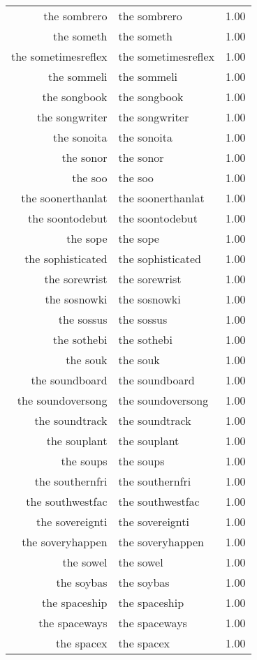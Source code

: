 \begin{table}[ht]
\begin{tabular}{rlr}
  the sombrero & the sombrero & 1.00 \\ 
  the someth & the someth & 1.00 \\ 
  the sometimesreflex & the sometimesreflex & 1.00 \\ 
  the sommeli & the sommeli & 1.00 \\ 
  the songbook & the songbook & 1.00 \\ 
  the songwriter & the songwriter & 1.00 \\ 
  the sonoita & the sonoita & 1.00 \\ 
  the sonor & the sonor & 1.00 \\ 
  the soo & the soo & 1.00 \\ 
  the soonerthanlat & the soonerthanlat & 1.00 \\ 
  the soontodebut & the soontodebut & 1.00 \\ 
  the sope & the sope & 1.00 \\ 
  the sophisticated & the sophisticated & 1.00 \\ 
  the sorewrist & the sorewrist & 1.00 \\ 
  the sosnowki & the sosnowki & 1.00 \\ 
  the sossus & the sossus & 1.00 \\ 
  the sothebi & the sothebi & 1.00 \\ 
  the souk & the souk & 1.00 \\ 
  the soundboard & the soundboard & 1.00 \\ 
  the soundoversong & the soundoversong & 1.00 \\ 
  the soundtrack & the soundtrack & 1.00 \\ 
  the souplant & the souplant & 1.00 \\ 
  the soups & the soups & 1.00 \\ 
  the southernfri & the southernfri & 1.00 \\ 
  the southwestfac & the southwestfac & 1.00 \\ 
  the sovereignti & the sovereignti & 1.00 \\ 
  the soveryhappen & the soveryhappen & 1.00 \\ 
  the sowel & the sowel & 1.00 \\ 
  the soybas & the soybas & 1.00 \\ 
  the spaceship & the spaceship & 1.00 \\ 
  the spaceways & the spaceways & 1.00 \\ 
  the spacex & the spacex & 1.00 \\ 

\end{tabular}
\end{table}
